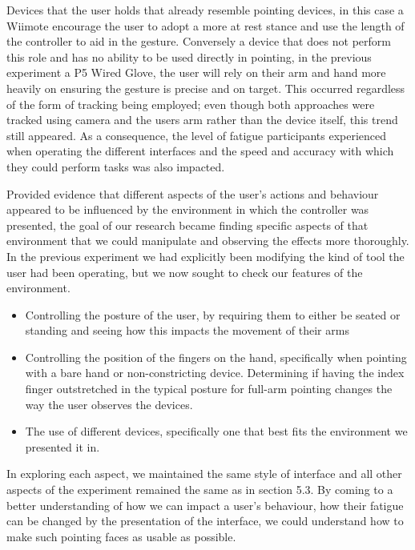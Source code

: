Devices that the user holds that already resemble pointing devices, in this case a Wiimote encourage the user to adopt a more at rest stance and use the length of the controller to aid in the gesture. Conversely a device that does not perform this role and has no ability to be used directly in pointing, in the previous experiment a P5 Wired Glove, the user will rely on their arm and hand more heavily on ensuring the gesture is precise and on target. This occurred regardless of the form of tracking being employed; even though both approaches were tracked using camera and the users arm rather than the device itself, this trend still appeared. As a consequence, the level of fatigue participants experienced when operating the different interfaces and the speed and accuracy with which they could perform tasks was also impacted.

Provided evidence that different aspects of the user's actions and behaviour appeared to be influenced by the environment in which the controller was presented, the goal of our research became finding specific aspects of that environment that we could manipulate and observing the effects more thoroughly. In the previous experiment we had explicitly been modifying the kind of tool the user had been operating, but we now sought to check our features of the environment.

\begin{itemize}

\item Controlling the posture of the user, by requiring them to either be seated or standing and seeing how this impacts the movement of their arms

\item Controlling the position of the fingers on the hand, specifically when pointing with a bare hand or non-constricting device. Determining if having the index finger outstretched in the typical posture for full-arm pointing changes the way the user observes the devices.

\item The use of different devices, specifically one that best fits the environment we presented it in.

\end{itemize}

In exploring each aspect, we maintained the same style of interface and all other aspects of the experiment remained the same as in section 5.3. By coming to a better understanding of how we can impact a user's behaviour, how their fatigue can be changed by the presentation of the interface, we could understand how to make such pointing faces as usable as possible.

